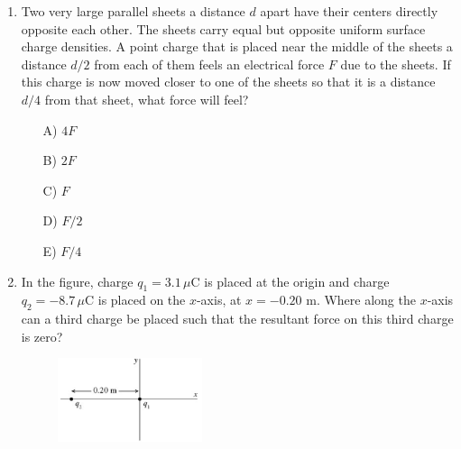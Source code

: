 \begin{enumerate}
    \begin{multicols}{5}
    \begin{itemize}
        \item[A)] Only regions $X$ and $Z$
        \item[B)] Only region $X$
        \item[C)] Only region $Y$
        \item[D)] Only region $Z$
        \item[E)] All three regions
    \end{itemize}
    \end{multicols}


    \item Two very large parallel sheets a distance $d$ apart have their centers directly opposite each other. The sheets carry equal but opposite uniform surface charge densities. A point charge that is placed near the middle of the sheets a distance $d/2$ from each of them feels an electrical force $F$ due to the sheets. If this charge is now moved closer to one of the sheets so that it is a distance $d/4$ from that sheet, what force will feel?

    \begin{multicols}{5}
    \begin{itemize}
        \item[A)] $4F$
        \item[B)] $2F$
        \item[C)] $F$
        \item[D)] $F/2$
        \item[E)] $F/4$
    \end{itemize}
    \end{multicols}


    \item In the figure, charge $q_1=3.1\,\mu$C is placed at the origin and charge $q_2=-8.7\,\mu$C is placed on the $x$-axis, at $x = -0.20$ m. Where along the $x$-axis can a third charge be placed such that the resultant force on this third charge is zero?

    \begin{figure}[H]
        \centering
        \includegraphics[width=0.4\textwidth,height=0.2\textwidth]{figures-workshop01/problem-5.png}
    \end{figure}


\end{enumerate}
